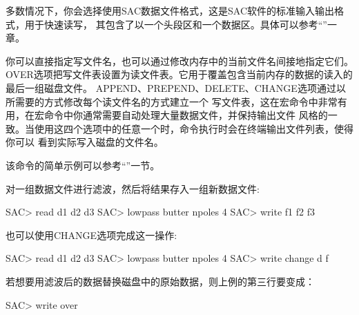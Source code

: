 多数情况下，你会选择使用SAC数据文件格式，这是SAC软件的标准输入输出格式，用于快速读写，
其包含了以一个头段区和一个数据区。具体可以参考``''一章。

你可以直接指定写文件名，也可以通过修改内存中的当前文件名间接地指定它们。
OVER选项把写文件表设置为读文件表。它用于覆盖包含当前内存的数据的读入的最后一组磁盘文件。
APPEND、PREPEND、DELETE、CHANGE选项通过以所需要的方式修改每个读文件名的方式建立一个
写文件表，这在宏命令中非常有用，在宏命令中你通常需要自动处理大量数据文件，并保持输出文件
风格的一致。当使用这四个选项中的任意一个时，命令执行时会在终端输出文件列表，使得你可以
看到实际写入磁盘的文件名。

该命令的简单示例可以参考``''一节。

对一组数据文件进行滤波，然后将结果存入一组新数据文件:
\begin{SACCode}
SAC> read d1 d2 d3
SAC> lowpass butter npoles 4
SAC> write f1 f2 f3
\end{SACCode}

也可以使用CHANGE选项完成这一操作:
\begin{SACCode}
SAC> read d1 d2 d3
SAC> lowpass butter npoles 4
SAC> write change d f
\end{SACCode}

若想要用滤波后的数据替换磁盘中的原始数据，则上例的第三行要变成：
\begin{SACCode}
SAC> write over
\end{SACCode}
